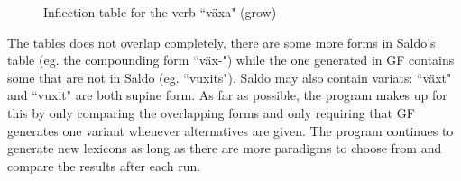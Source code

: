\documentclass{report}
\begin{document}
\begin{figure}[h]
  \begin{center}
\hspace{5mm}
\caption{Inflection table for the verb ``växa" (grow)}
\label{pic:TabVax}
  \end{center}
\end{figure}
The tables does not overlap completely, there are some more forms in Saldo's table (eg. the 
compounding form ``väx-")
while the one generated in GF contains some that are not in Saldo (eg. ``vuxits").
Saldo may also contain variats: ``växt" and ``vuxit" are both supine form.
As far as possible, the program makes up for this by only comparing the overlapping forms
and only requiring that GF generates one variant whenever alternatives are given. 
The program continues to generate new lexicons as long as there are more
paradigms to choose from and compare the results after each run.
\end{document}
